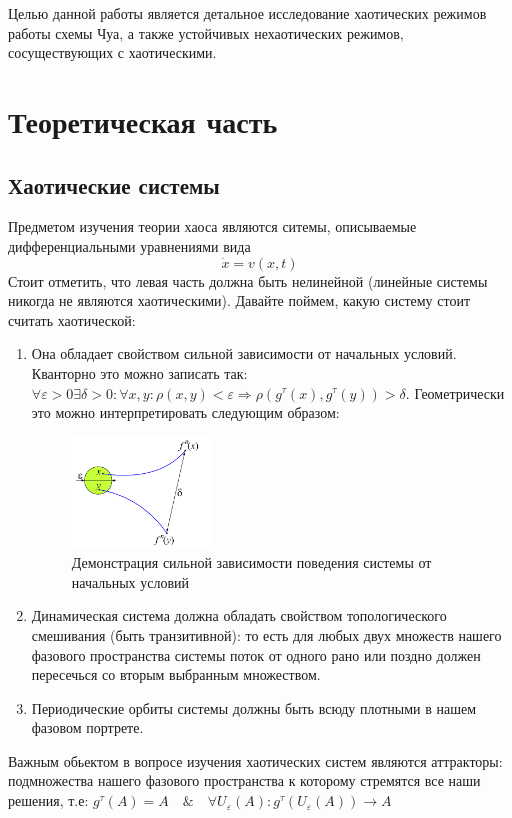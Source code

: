 \documentclass[12pt]{article}
\begin{document}
Целью данной работы является детальное исследование хаотических режимов работы схемы Чуа,
а также устойчивых нехаотических режимов, сосуществующих с хаотическими.

\section*{Теоретическая часть}
\subsection*{Хаотические системы}
Предметом изучения теории хаоса являются ситемы, описываемые дифференциальными уравнениями вида $$\dot{x} = v(x,t)$$
Стоит отметить, что левая часть должна быть нелинейной (линейные системы никогда не являются хаотическими). Давайте поймем, какую систему стоит считать хаотической:
\begin{enumerate}
	\item Она обладает свойством сильной зависимости от начальных условий. Кванторно это можно записать так: $\forall \varepsilon > 0 \exists \delta > 0: \forall x,y :  \rho(x,y) < \varepsilon \Rightarrow \rho(g^{\tau}(x),g^{\tau}(y)) > \delta$.
			Геометрически это можно интерпретировать следующим образом:
			\begin{figure}[H]
				\centering
				\includegraphics[width=0.35\textwidth]{dependance_st_pos.png}
				\caption{Демонстрация сильной зависимости поведения системы от начальных условий}
				\label{fig:demonstrate_dependance}
			\end{figure}
	\item Динамическая система должна обладать свойством топологического смешивания (быть транзитивной): то есть для любых двух множеств нашего фазового пространства системы поток от одного рано или поздно должен пересечься со вторым выбранным множеством.
	\item Периодические орбиты системы должны быть всюду плотными в нашем фазовом портрете.
\end{enumerate}

Важным обьектом в вопросе изучения хаотических систем являются аттракторы: подмножества нашего фазового пространства к которому стремятся все наши решения, т.е:
$g^{\tau}(A) = A \quad\&\quad \forall U_{\varepsilon}(A): g^{\tau}(U_{\varepsilon}(A)) \rightarrow A$
\end{document}
